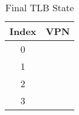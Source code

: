 \begin{parts}
     \begin{table}[ht]
        \centering
        \caption{Final TLB State}
        \label{tab:tlb_state_2}
        \renewcommand{\arraystretch}{1.5} 
        \begin{tabular}{|c|p{5cm}|} %
        \hline %
        \multicolumn{1}{|c|}{\textbf{Index}} & \multicolumn{1}{c|}{\textbf{VPN}} \\ 
        \hline
        0 & \\ \hline
        1 & \\ \hline
        2 & \\ \hline
        3 & \\ \hline
        \end{tabular}
    \end{table}


\end{parts}